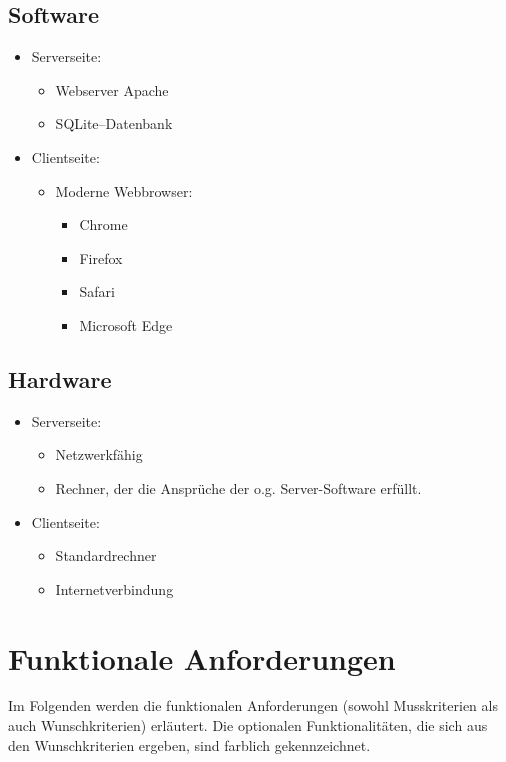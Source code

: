 \documentclass[parskip=full,11pt]{scrartcl}
\begin{document}
\subsection{Software}
\begin{itemize}[itemsep=0pt]
\item Serverseite:
	\begin{itemize}
	\item Webserver Apache 
	\item SQLite–Datenbank
	\end{itemize}
\item Clientseite:
	\begin{itemize}
	\item Moderne Webbrowser:
		\begin{itemize}
		\item Chrome
		\item Firefox
		\item Safari
		\item Microsoft Edge
		\end{itemize}
	
	\end{itemize}
\end{itemize}
\newpage
\subsection{Hardware}
\begin{itemize}[itemsep=0pt]

	\item Serverseite:
	\begin{itemize}
	\item Netzwerkfähig
	\item Rechner, der die Ansprüche der o.g. Server-Software erfüllt.
	\end{itemize}
	\item Clientseite:
	\begin{itemize}
	\item Standardrechner
	\item Internetverbindung
	\end{itemize}
\end{itemize}
\section{Funktionale Anforderungen}
Im Folgenden werden die funktionalen Anforderungen (sowohl Musskriterien als auch Wunschkriterien) erläutert. Die optionalen Funktionalitäten, die sich aus den Wunschkriterien ergeben, sind \colorbox{shadecolor}{farblich gekennzeichnet}.
\end{document}

